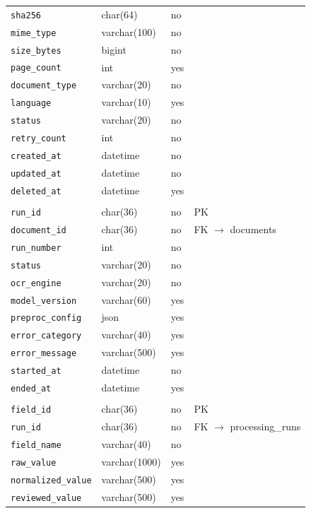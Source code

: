 {\begin{longtable}{L{4.2cm}L{3.4cm}L{1.1cm}L{5.0cm}}
\texttt{sha256} & char(64) & no & \\
\texttt{mime\_type} & varchar(100) & no & \\
\texttt{size\_bytes} & bigint & no & \\
\texttt{page\_count} & int & yes & \\
\texttt{document\_type} & varchar(20) & no & \\
\texttt{language} & varchar(10) & yes & \\
\texttt{status} & varchar(20) & no & \\
\texttt{retry\_count} & int & no & \\
\texttt{created\_at} & datetime & no & \\
\texttt{updated\_at} & datetime & no & \\
\texttt{deleted\_at} & datetime & yes & \\
\\
\texttt{run\_id} & char(36) & no & PK\\
\texttt{document\_id} & char(36) & no & FK $\rightarrow$ documents\\
\texttt{run\_number} & int & no & \\
\texttt{status} & varchar(20) & no & \\
\texttt{ocr\_engine} & varchar(20) & no & \\
\texttt{model\_version} & varchar(60) & yes & \\
\texttt{preproc\_config} & json & yes & \\
\texttt{error\_category} & varchar(40) & yes & \\
\texttt{error\_message} & varchar(500) & yes & \\
\texttt{started\_at} & datetime & no & \\
\texttt{ended\_at} & datetime & yes & \\
\\
\texttt{field\_id} & char(36) & no & PK\\
\texttt{run\_id} & char(36) & no & FK $\rightarrow$ processing\_runs\\
\texttt{field\_name} & varchar(40) & no & \\
\texttt{raw\_value} & varchar(1000) & yes & \\
\texttt{normalized\_value} & varchar(500) & yes & \\
\texttt{reviewed\_value} & varchar(500) & yes & \\

\end{longtable}}
